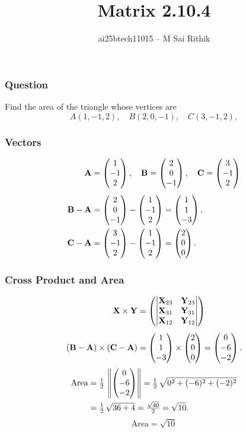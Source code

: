 \documentclass{beamer}
\title{Matrix 2.10.4}
\author{ai25btech11015 -- M Sai Rithik}
\date{}
\begin{document}
\maketitle

\begin{frame}
\frametitle{Question}
Find the area of the triangle whose vertices are  
\[
A(1,-1,2), \quad B(2,0,-1), \quad C(3,-1,2),
\]  
\end{frame}

\begin{frame}
\frametitle{Vectors}
\begin{align}
\mathbf{A} &= \begin{pmatrix}1 \\ -1 \\ 2\end{pmatrix}, \quad
\mathbf{B} = \begin{pmatrix}2 \\ 0 \\ -1\end{pmatrix}, \quad
\mathbf{C} = \begin{pmatrix}3 \\ -1 \\ 2\end{pmatrix} \\[1ex]
\mathbf{B} - \mathbf{A} &= \begin{pmatrix}2 \\ 0 \\ -1\end{pmatrix} - \begin{pmatrix}1 \\ -1 \\ 2\end{pmatrix}
= \begin{pmatrix}1 \\ 1 \\ -3\end{pmatrix}, \\
\mathbf{C} - \mathbf{A} &= \begin{pmatrix}3 \\ -1 \\ 2\end{pmatrix} - \begin{pmatrix}1 \\ -1 \\ 2\end{pmatrix}
= \begin{pmatrix}2 \\ 0 \\ 0\end{pmatrix}.
\end{align}
\end{frame}

\begin{frame}
\frametitle{Cross Product and Area}
\begin{align}
\mathbf{X} \times \mathbf{Y} &=
\begin{pmatrix}
\begin{vmatrix}\mathbf{X}_{23} & \mathbf{Y}_{23}\end{vmatrix} \\
\begin{vmatrix}\mathbf{X}_{31} & \mathbf{Y}_{31}\end{vmatrix} \\
\begin{vmatrix}\mathbf{X}_{12} & \mathbf{Y}_{12}\end{vmatrix}
\end{pmatrix} \\[1ex]
(\mathbf{B}-\mathbf{A}) \times (\mathbf{C}-\mathbf{A}) 
&= \begin{pmatrix}1 \\ 1 \\ -3\end{pmatrix} \times \begin{pmatrix}2 \\ 0 \\ 0\end{pmatrix}
= \begin{pmatrix}0 \\ -6 \\ -2\end{pmatrix}.
\end{align}
\pause
\begin{align}
\text{Area} &= \tfrac{1}{2}\,\left\lVert\begin{pmatrix}0 \\ -6 \\ -2\end{pmatrix}\right\rVert 
= \tfrac{1}{2}\,\sqrt{0^2+(-6)^2+(-2)^2} \\
&= \tfrac{1}{2}\,\sqrt{36+4}
= \tfrac{\sqrt{40}}{2}
= \sqrt{10}.
\end{align}
\[
\boxed{\text{Area} = \sqrt{10}}
\]
\end{frame}
\end{document}
